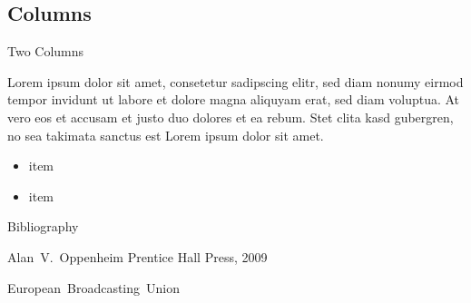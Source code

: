 \documentclass[compress]{beamer}
\begin{document}
\subsection{Columns}
\begin{frame}{Two Columns}
    \begin{multicols}{2}
        Lorem ipsum dolor sit amet, consetetur sadipscing elitr, sed diam nonumy eirmod tempor invidunt ut labore et dolore magna aliquyam erat, sed diam voluptua. At vero eos et accusam et justo duo dolores et ea rebum. Stet clita kasd gubergren, no sea takimata sanctus est Lorem ipsum dolor sit amet.
        \begin{itemize}
            \item item
            \item item
        \end{itemize}
    \end{multicols}
\end{frame}

\begin{frame}{Bibliography}
	\begin{thebibliography}{10}
    
	\beamertemplatebookbibitems
	Alan~V.~Oppenheim
	\newblock {}
	\newblock Prentice Hall Press, 2009

	\beamertemplatearticlebibitems
	European~Broadcasting~Union
	\newblock {}
  \end{thebibliography}
\end{frame}
\end{document}
